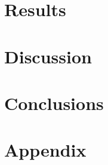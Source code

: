 \documentclass[draft,linenumbers]{agujournal2018}
\begin{document}
\section{Results}
\label{Results}

\section{Discussion}
\label{Discussion}

\section{Conclusions}

\clearpage

\section{Appendix}
\end{document}
